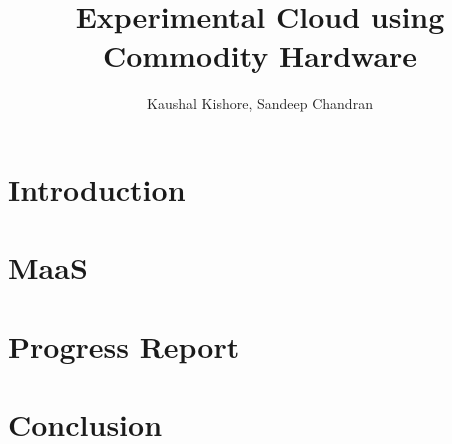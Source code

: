 \documentclass[aspectratio=169,11pt]{beamer}
\title[Interim Report]{Experimental Cloud using Commodity Hardware}
\author[111601008]{Kaushal Kishore, Sandeep Chandran}
\begin{document}


\section{Introduction} 


\section{MaaS}


\section{Progress Report}


\section{Conclusion}


% 

% 

% 

% 

% 

% 
\end{document}
